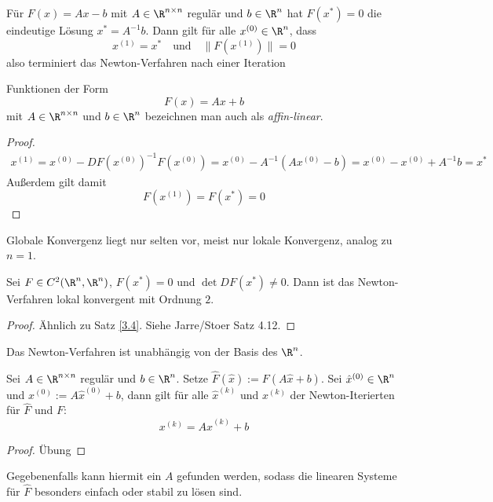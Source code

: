 \documentclass[11pt]{scrbook}
\begin{document}
\begin{lem} \label{3.22}
	Für $F(x) = Ax - b$ mit $A\in \R^{n\times n}$ regulär und $b\in \R^n$ hat $F(x^*)=0$ die eindeutige Lösung $x^* = A^{-1}b$.
	Dann gilt für alle $x^{(0)} \in \R^n$, dass
	\[
		x^{(1)} = x^*
		\quad\text{und}\quad
		\|F(x^{(1)})\| = 0
	\]
	also terminiert das Newton-Verfahren nach einer Iteration
	\begin{note}
		Funktionen der Form
		\[
			F(x) = Ax + b
		\]
		mit $A\in \R^{n\times n}$ und $b\in \R^n$ bezeichnen man auch als \emph{affin-linear}.
	\end{note}
	\begin{proof}
		\begin{align*}
			x^{(1)} = x^{(0)} - DF(x^{(0)})^{-1}F(x^{(0)}) = x^{(0)} - A^{-1} (Ax^{(0)}-b) = x^{(0)} - x^{(0)} + A^{-1}b = x^*
		\end{align*}
		Außerdem gilt damit
		\[
			F(x^{(1)}) = F(x^*) = 0
		\]
	\end{proof}
	\begin{note}
		Globale Konvergenz liegt nur selten vor, meist nur lokale Konvergenz, analog zu $n=1$.
	\end{note}
\end{lem}

\begin{st} \label{3.23}
	Sei $F \in C^2(\R^n, \R^n)$, $F(x^*) = 0$ und $\det DF(x^*) \neq 0$.
	Dann ist das Newton-Verfahren lokal konvergent mit Ordnung $2$.
	\begin{proof}
		Ähnlich zu Satz \ref{3.4}.
		Siehe Jarre/Stoer Satz 4.12.
	\end{proof}
\end{st}

Das Newton-Verfahren ist unabhängig von der Basis des $\R^n$.

\begin{st} \label{3.24}
	Sei $A\in \R^{n\times n}$ regulär und $b \in \R^n$.
	Setze $\hat F(\hat x) := F(A\hat x+b)$.
	Sei $\hat x^{(0)} \in \R^n$ und $x^{(0)} := A\hat x^{(0)} + b$, dann gilt für alle $\hat x^{(k)}$ und $x^{(k)}$ der Newton-Iterierten für $\hat F$ und $F$:
	\[
		x^{(k)} = A \hat x^{(k)} + b
	\]
	\begin{proof}
		Übung
	\end{proof}
	\begin{note}
		Gegebenenfalls kann hiermit ein $A$ gefunden werden, sodass die linearen Systeme für $\hat F$ besonders einfach oder stabil zu lösen sind.
	\end{note}
\end{st}
\end{document}

